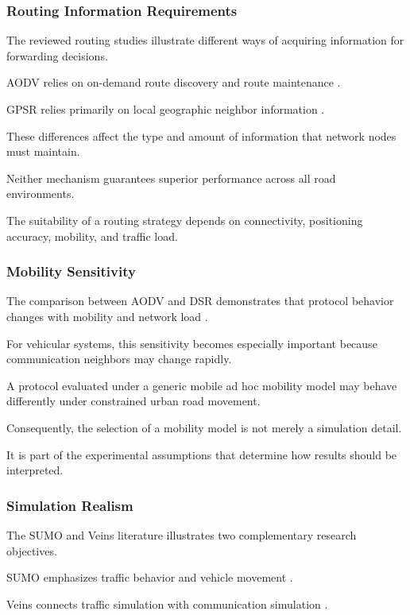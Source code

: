 \subsubsection{Routing Information Requirements}

The reviewed routing studies
illustrate different ways
of acquiring information
for forwarding decisions.

AODV relies on on-demand
route discovery and
route maintenance
\cite{Perkins1999}.

GPSR relies primarily
on local geographic
neighbor information
\cite{Karp2000}.

These differences affect
the type and amount
of information that
network nodes must
maintain.

Neither mechanism
guarantees superior
performance across
all road environments.

The suitability of
a routing strategy
depends on connectivity,
positioning accuracy,
mobility, and traffic load.

\subsubsection{Mobility Sensitivity}

The comparison between
AODV and DSR demonstrates
that protocol behavior
changes with mobility
and network load
\cite{Perkins2001}.

For vehicular systems,
this sensitivity becomes
especially important
because communication
neighbors may change
rapidly.

A protocol evaluated
under a generic mobile
ad hoc mobility model
may behave differently
under constrained
urban road movement.

Consequently, the
selection of a
mobility model is
not merely a
simulation detail.

It is part of the
experimental assumptions
that determine how
results should be
interpreted.

\subsubsection{Simulation Realism}

The SUMO and Veins
literature illustrates
two complementary
research objectives.

SUMO emphasizes
traffic behavior
and vehicle movement
\cite{Krajzewicz2012}.

Veins connects
traffic simulation
with communication
simulation
\cite{Sommer2011}.

